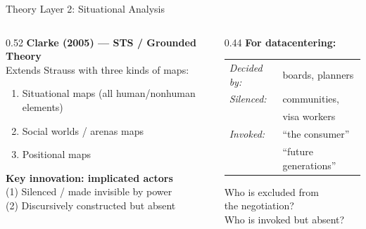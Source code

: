 \documentclass[aspectratio=169,12pt]{beamer}
\begin{document}
\begin{frame}{Theory Layer 2: Situational Analysis}
\begin{columns}[T]
\begin{column}{0.52\textwidth}
  \textbf{Clarke (2005) — STS / Grounded Theory}\\[0.3em]
  \footnotesize
  Extends Strauss with three kinds of maps:\\[0.3em]
  \begin{enumerate}\setlength\itemsep{0.2em}
    \item Situational maps (all human/nonhuman elements)
    \item Social worlds / arenas maps
    \item Positional maps
  \end{enumerate}
  \vspace{0.4em}
  \small\textbf{Key innovation: implicated actors}\\[0.3em]
  \footnotesize
  (1) Silenced / made invisible by power\\
  (2) Discursively constructed but absent
\end{column}
\begin{column}{0.44\textwidth}
  \vspace{0.3em}
  \footnotesize\textbf{For datacentering:}\\[0.4em]
  \begin{tabular}{@{}ll@{}}
    \textit{Decided by:} & boards, planners \\[0.2em]
    \textit{Silenced:}   & communities,\\
                         & visa workers \\[0.2em]
    \textit{Invoked:}    & ``the consumer''\\
                         & ``future generations'' \\
  \end{tabular}
  \vspace{0.5em}

  \footnotesize\alert{Who is excluded from\\
  the negotiation?\\
  Who is invoked but absent?}
\end{column}
\end{columns}
\end{frame}
\end{document}
